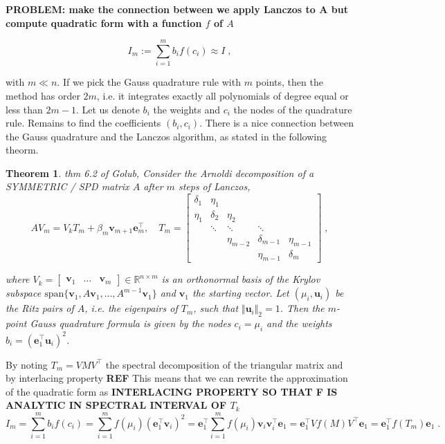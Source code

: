 \documentclass{article}
\newtheorem{theorem}{Theorem}[section]
\newcommand{\vect}[1]{\boldsymbol{\mathbf{#1}}}
\newcommand{\R}{\mathbb R}
\begin{document}
\textbf{PROBLEM: make the connection between we apply Lanczos to A but compute quadratic form with a function $f$ of $A$}

\begin{equation*}
    I_m := \sum_{i=1}^m b_i f(c_i) \approx I \; ,
\end{equation*}

with $m \ll n$. If we pick the Gauss quadrature rule with $m$ points, then the method has order $2m$, i.e. it integrates exactly all polynomials of degree equal or less than $2m-1$. Let us denote $b_i$ the weights and $c_i$ the nodes of the quadrature rule. Remains to find the coefficients $(b_i, c_i)$. There is a nice connection between the Gauss quadrature and the Lanczos algorithm, as stated in the following theorm.


\begin{theorem}
thm 6.2 of Golub, Consider the Arnoldi decomposition of a SYMMETRIC / SPD matrix $A$ after $m$ steps of Lanczos,
\begin{equation*}
    A V_m = V_k T_m + \beta_m \vect v_{m+1} \vect e_m^\top, \quad T_m = \begin{bmatrix}
        \delta_1 & \eta_1   &              &               & \\
        \eta_1   & \delta_2 & \eta_2       &               & \\
                 & \ddots   & \ddots       & \ddots        & \\
                 &          & \eta_{m-2}   & \delta_{m-1}  & \eta_{m-1} \\
                 &          &              & \eta_{m-1}   & \delta_m
    \end{bmatrix} \;,
\end{equation*}

where $V_k = \begin{bmatrix} \vect v_1 & \dots & \vect v_m \end{bmatrix} \in\R^{n\times m}$ is an orthonormal basis of the Krylov subspace $\text{span}\{\vect v_1, A \vect v_1, \ldots, A^{m-1} \vect v_1\}$ and $\vect v_1$ the starting vector. Let $(\mu_i, \vect u_i)$ be the Ritz pairs of $A$, i.e. the eigenpairs of $T_m$, such that $\Vert \vect u_i \Vert_2 = 1$. Then the $m$-point Gauss quadrature formula is given by the nodes $c_i = \mu_i$ and the weights $b_i = (\vect e_1^\top \vect u_i)^2$.
\end{theorem}


By noting $T_m = VMV^\top$ the spectral decomposition of the triangular matrix and by interlacing property \textbf{REF}
This means that we can rewrite the approximation of the quadratic form as \textbf{INTERLACING PROPERTY SO THAT F IS ANALYTIC IN SPECTRAL INTERVAL OF $T_k$}
\begin{equation*}
    I_m = \sum_{i=1}^m b_i f(c_i) = \sum_{i=1}^m f(\mu_i) (\vect e_1^\top \vect v_i)^2 = \vect e_1^\top \sum_{i=1}^m f(\mu_i) \vect v_i \vect v_i^\top \vect e_1 = \vect e_1^\top V f(M) V^\top \vect e_1 = \vect e_1^\top f(T_m) \vect e_1 \;.
\end{equation*}
\end{document}
